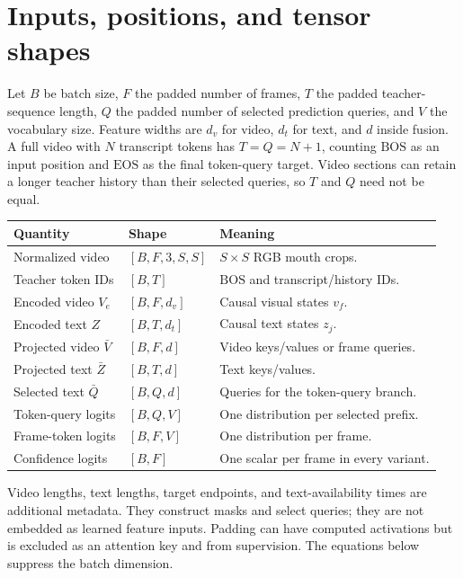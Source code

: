 \documentclass[11pt,a4paper]{article}
\newcommand{\BOS}{\ensuremath{\mathrm{BOS}}}
\newcommand{\EOS}{\ensuremath{\mathrm{EOS}}}
\numberwithin{equation}{section}
\begin{document}
\section{Inputs, positions, and tensor shapes}
\label{sec:inputs}

Let $B$ be batch size, $F$ the padded number of frames, $T$ the padded
teacher-sequence length, $Q$ the padded number of selected prediction
queries, and $V$ the vocabulary size. Feature widths are $d_v$ for video,
$d_t$ for text, and $d$ inside fusion. A full video with $N$ transcript
tokens has $T=Q=N+1$, counting \BOS{} as an input position and \EOS{} as
the final token-query target. Video sections can retain a longer teacher
history than their selected queries, so $T$ and $Q$ need not be equal.

\begin{center}
\small
\begin{tabularx}{\linewidth}{@{}l l Y@{}}
\toprule
Quantity & Shape & Meaning \\
\midrule
Normalized video & $[B,F,3,S,S]$ & $S\times S$ RGB mouth crops. \\
Teacher token IDs & $[B,T]$ & \BOS{} and transcript/history IDs. \\
Encoded video $V_e$ & $[B,F,d_v]$ & Causal visual states $v_f$. \\
Encoded text $Z$ & $[B,T,d_t]$ & Causal text states $z_j$. \\
Projected video $\bar V$ & $[B,F,d]$ & Video keys/values or frame queries. \\
Projected text $\bar Z$ & $[B,T,d]$ & Text keys/values. \\
Selected text $\bar Q$ & $[B,Q,d]$ & Queries for the token-query branch. \\
Token-query logits & $[B,Q,V]$ & One distribution per selected prefix. \\
Frame-token logits & $[B,F,V]$ & One distribution per frame. \\
Confidence logits & $[B,F]$ & One scalar per frame in every variant. \\
\bottomrule
\end{tabularx}
\end{center}

Video lengths, text lengths, target endpoints, and text-availability
times are additional metadata. They construct masks and select queries;
they are not embedded as learned feature inputs. Padding can have
computed activations but is excluded as an attention key and from
supervision. The equations below suppress the batch dimension.
\end{document}
